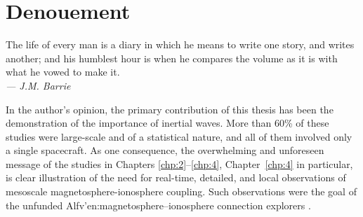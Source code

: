 
  \chapter{Denouement}
  \label{chp:outro}

  \begin{flushright}
    \begin{minipage}[]{0.55\linewidth}
      \begin{flushright}
        The life of every man is a diary in which he means to write
        one story, and writes another; and his humblest hour is when
        he compares the volume as it is with what he vowed to make
        it. \\{\small \emph{--- J.M. Barrie} }
      \end{flushright}
    \end{minipage}
  \end{flushright}
  \vspace{\baselineskip}


  In the author's opinion, the primary contribution of this thesis has
  been the demonstration of the importance of inertial \Alf
  waves. More than 60\% of these studies were large-scale and of a
  statistical nature, and all of them involved only a single
  spacecraft. As one consequence, the overwhelming and unforeseen
  message of the studies in Chapters \ref{chp:2}--\ref{chp:4},
  Chapter~\ref{chp:4} in particular, is clear illustration of the need
  for real-time, detailed, and local observations of mesoscale
  magnetosphere-ionosphere coupling. Such observations were the goal
  of the unfunded Alfv'{e}n:magnetosphere--ionosphere connection
  explorers \citep{Berthomier2011}.

